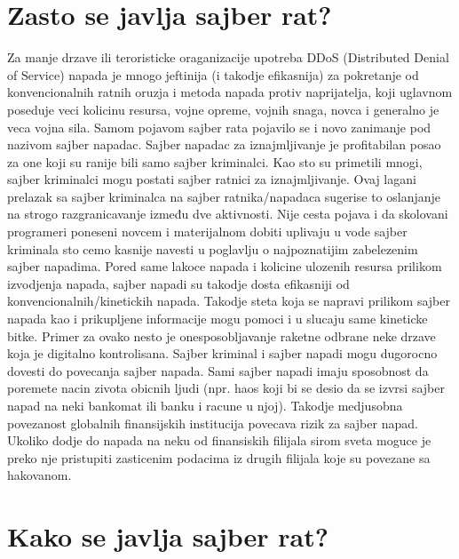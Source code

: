 \documentclass[a4paper]{article}
\begin{document}
{\newpage

 



\section{Zasto se javlja sajber rat?}
\label{slike_i_tabele}

Za manje drzave ili teroristicke oraganizacije upotreba DDoS (Distributed Denial of Service) napada je mnogo jeftinija (i takodje efikasnija) za pokretanje od konvencionalnih ratnih oruzja i metoda napada protiv naprijatelja, koji uglavnom poseduje veci kolicinu resursa, vojne opreme, vojnih snaga, novca i generalno je veca vojna sila. Samom pojavom sajber rata pojavilo se i novo zanimanje pod nazivom sajber napadac. Sajber napadac za iznajmljivanje je profitabilan posao za one koji su ranije bili samo sajber kriminalci.
Kao sto su primetili mnogi, sajber kriminalci mogu postati sajber ratnici za iznajmljivanje. 
Ovaj lagani prelazak sa sajber kriminalca na sajber ratnika/napadaca sugerise to oslanjanje na strogo razgranicavanje između dve aktivnosti. Nije cesta pojava i da skolovani programeri poneseni novcem i materijalnom dobiti uplivaju u vode sajber kriminala sto cemo kasnije navesti u poglavlju o najpoznatijim zabelezenim sajber napadima. Pored same lakoce napada i kolicine ulozenih resursa prilikom izvodjenja napada, sajber napadi su takodje dosta efikasniji od konvencionalnih/kinetickih napada. Takodje steta koja se napravi prilikom sajber napada kao i prikupljene informacije mogu pomoci i u slucaju same kineticke bitke. Primer za ovako nesto je onesposobljavanje raketne odbrane neke drzave koja je digitalno kontrolisana.
Sajber kriminal i sajber napadi mogu dugorocno dovesti do povecanja sajber napada.
Sami sajber napadi imaju sposobnost da poremete nacin zivota obicnih ljudi (npr. haos koji bi se desio da se izvrsi sajber napad na neki bankomat ili banku i racune u njoj). Takodje medjusobna povezanost globalnih finansijskih institucija povecava rizik za sajber napad.
Ukoliko dodje do napada na neku od finansiskih filijala sirom sveta moguce je preko nje pristupiti zasticenim podacima iz drugih filijala koje su povezane sa hakovanom.







\section{Kako se javlja sajber rat?}
\label{sec:naslov1}

}
\end{document}
